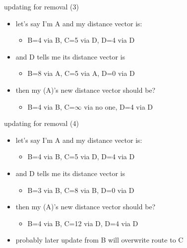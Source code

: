 \begin{frame}{updating for removal (3)}
    \begin{itemize}
    \item let's say I'm A and my distance vector is:
        \begin{itemize}
        \item B=4 via B, C=5 via D, D=4 via D
        \end{itemize}
    \item and D tells me its distance vector is
        \begin{itemize}
        \item B=8 via A, C=5 via A, D=0 via D
        \end{itemize}
    \item then my (A)'s new distance vector should be?
        \begin{itemize}
        \item<2->B=4 via B, C=$\infty$ via no one, D=4 via D
        \end{itemize}
    \end{itemize}
\end{frame}

\begin{frame}{updating for removal (4)}
    \begin{itemize}
    \item let's say I'm A and my distance vector is:
        \begin{itemize}
        \item B=4 via B, C=5 via D, D=4 via D
        \end{itemize}
    \item and D tells me its distance vector is
        \begin{itemize}
        \item B=3 via B, C=8 via B, D=0 via D
        \end{itemize}
    \item then my (A)'s new distance vector should be?
        \begin{itemize}
        \item<2->B=4 via B, C=12 via D, D=4 via D
        \end{itemize}
    \vspace{.5cm}
    \item<2-> probably later update from B will overwrite route to C
    \end{itemize}
\end{frame}

